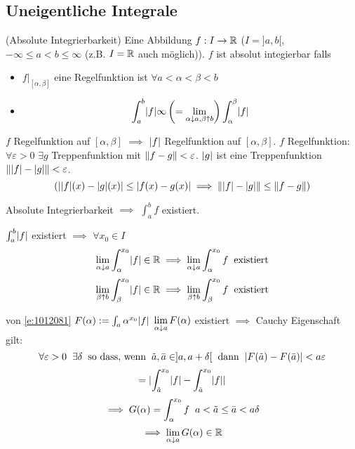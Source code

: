 \subsection{Uneigentliche Integrale}
\begin{Def}{(Absolute Integrierbarkeit)}
  Eine Abbildung $f:I\to\mathbb{R}$ ($I=]a,b[$, $-\infty\leq a < b \leq \infty$ (z.B. $I=\mathbb{R}$ auch möglich)). $f$ ist absolut integierbar falls
  \begin{itemize}
    \item $f|_{[\alpha,\beta]}$ eine Regelfunktion ist $\forall a<\alpha<\beta<b$
    \item 
      \[\int_a^b\mathopen| f \mathclose|\infty \left( =\lim_{\alpha\downarrow a, \beta\uparrow b}\right)\int_\alpha^\beta\mathopen| f \mathclose|\]
  \end{itemize}
\end{Def}
\begin{Bem}
  $f$ Regelfunktion auf $[\alpha,\beta]$ $\implies$ $\mathopen| f \mathclose|$ Regelfunktion auf $[\alpha,\beta]$. $f$ Regelfunktion: $\forall \varepsilon>0$ $\exists g$ Treppenfunktion mit $\left\| f-g \right\|<\varepsilon$. $\mathopen| g \mathclose|$ ist eine Treppenfunktion $\left\| \mathopen| f \mathclose|-\mathopen| g \mathclose| \right\|<\varepsilon$.
  \[\left( \mathopen| \mathopen| f \mathclose|(x)-\mathopen| g \mathclose|(x) \mathclose|\leq\mathopen| f(x)-g(x) \mathclose|\implies \left\| \mathopen| f \mathclose|-\mathopen| g \mathclose| \right\|\leq\left\| f-g \right\| \right)\]
\end{Bem}
\begin{Sat}
  Absolute Integrierbarkeit $\implies$ $\int_a^b f$ existiert.
\end{Sat}
\begin{Bew}
  $\int_a^b\mathopen| f \mathclose|$ existiert $\implies$ $\forall x_0\in I$
  \begin{equation}\label{e:1012081}
    \displaystyle\lim_{\alpha\downarrow a}\int_\alpha^{x_0}\mathopen| f \mathclose|\in\mathbb{R}\implies\displaystyle\lim_{\alpha\downarrow a}\int_\alpha^{x_0}f\hspace{2mm}\text{existiert}
  \end{equation}
  \begin{equation}\label{e:1012082}
    \displaystyle\lim_{\beta\uparrow b}\int_\beta^{x_0}\mathopen| f \mathclose|\in\mathbb{R}\implies\displaystyle\lim_{\beta\uparrow b}\int_\beta^{x_0}f\hspace{2mm}\text{existiert}
  \end{equation}
\end{Bew}
\begin{Bew}{von \ref{e:1012081}} $F(\alpha):=\int_a\alpha^{x_0}\mathopen| f \mathclose|$ $\displaystyle\lim_{\alpha\downarrow a} F(\alpha)$ existiert $\implies$ Cauchy Eigenschaft gilt:
  \[\forall \varepsilon>0\hspace{2mm}\exists\delta\hspace{2mm}\text{so dass, wenn}\hspace{2mm}\tilde a,\bar a\in]a,a+\delta[\hspace{2mm}\text{dann}\hspace{2mm}\mathopen| F(\tilde a)-F(\bar a) \mathclose| < a\varepsilon\]
  \[= \mathopen| \int_{\tilde{a}}^{x_0}\mathopen| f \mathclose|-\int_{\bar{a}}^{x_0} \mathopen| f \mathclose|  \mathclose| \]
  \[\implies G(\alpha)=\int_\alpha^{x_0}f\hspace{2mm} a<\tilde{a}\leq \bar{a}<a\delta\]
  \[\implies \displaystyle\lim_{\alpha\downarrow a}G(\alpha)\in\mathbb{R}\]
\end{Bew}
